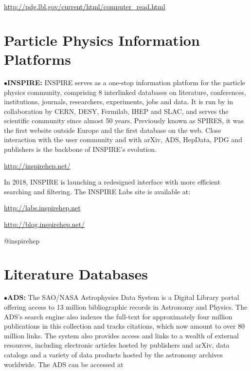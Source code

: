            \item{}\qquad\url{http://pdg.lbl.gov/current/html/computer\_read.html}

\section{Particle Physics Information Platforms}%


\item{$\bullet$}{\bf INSPIRE:}
INSPIRE serves as a one-stop information platform for the particle physics community, comprising 8 interlinked databases on literature, conferences, institutions, journals, researchers, experiments, jobs and data. It is run by in collaboration by CERN, DESY, Fermilab, IHEP and SLAC, and serves the scientific community since almost 50 years. Previously known as SPIRES, it was the first website outside Europe and the first database on the web. Close interaction with the user community and with arXiv, ADS, HepData, PDG and publishers is the backbone of INSPIRE’s evolution. 
	\item{}\qquad\url{http://inspirehep.net/}

\item{}In 2018, INSPIRE is launching a redesigned interface with more efficient searching and filtering. The INSPIRE Labs site is available at:

	\item{}\qquad\url{http://labs.inspirehep.net}
	\item{} \url{http://blog.inspirehep.net/}
	\item{} @inspirehep


\vglue -0.1in
\section{Literature Databases}%

\item{$\bullet$}{\bf ADS:} 
The SAO/NASA Astrophysics Data System is a Digital Library portal offering access to 13 million bibliographic records in Astronomy and Physics.  The ADS's search engine also indexes the full-text for approximately four million publications in this collection and tracks citations, which now amount to over 80 million links.  The system also provides access and links to a wealth of external resources, including electronic articles hosted by publishers and arXiv, data catalogs and a variety of data products hosted by the astronomy archives worldwide.  The ADS can be accessed at

